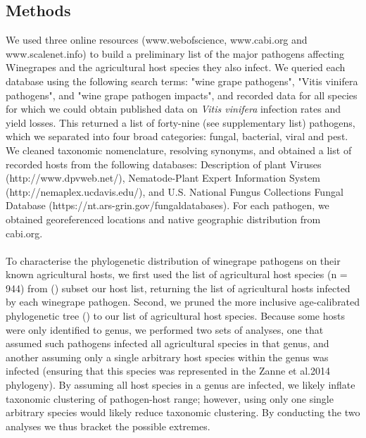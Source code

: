 \documentclass{article}
\begin{document}
\subsection{Methods}
We used three online resources (www.webofscience, www.cabi.org and www.scalenet.info) to build a preliminary list of the major pathogens affecting Winegrapes and the agricultural host species they also infect. We queried each database using the following search terms: "wine grape pathogens", "Vitis vinifera pathogens", and "wine grape pathogen impacts", and recorded data for all species for which we could obtain published data on \textit{Vitis vinifera} infection rates and yield losses. This returned a list of forty-nine (see supplementary list) pathogens, which we separated into four broad categories: fungal, bacterial, viral and pest. We cleaned taxonomic nomenclature, resolving synonyms, and obtained a list of recorded hosts from the following databases: Description of plant Viruses (http://www.dpvweb.net/), Nematode-Plant Expert Information System (http://nemaplex.ucdavis.edu/), and  U.S. National Fungus Collections Fungal Database (https://nt.ars-grin.gov/fungaldatabases). For each pathogen, we obtained georeferenced locations and native geographic distribution from cabi.org.

\paragraph{}To characterise the phylogenetic distribution of winegrape pathogens on their known agricultural hosts, we first used the list of agricultural host species (n = 944) from (\citep{Milla2018}) subset our host list, returning the list of agricultural hosts infected by each winegrape pathogen. Second, we pruned the more inclusive age-calibrated phylogenetic tree (\citep{Zanne2014}) to our list of agricultural host species. Because some hosts were only identified to genus, we performed two sets of analyses, one that assumed such pathogens infected all agricultural species in that genus, and another assuming only a single arbitrary host species within the genus was infected (ensuring that this species was represented in the Zanne et al.2014 phylogeny\citep{Zanne2014}). By assuming all host species in a genus are infected, we likely inflate taxonomic clustering of pathogen-host range;  however, using only one single arbitrary species would likely reduce taxonomic clustering. By conducting the two analyses we thus bracket the possible extremes.
\end{document}
